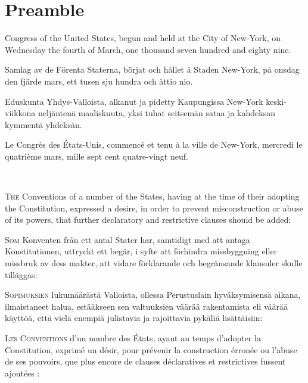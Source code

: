 \documentclass[a4paper,landscape,12pt]{article}
\begin{document}
\section*{Preamble}


\begin{minipage}[t]{0.22\textwidth}
Congress of the United States, begun and held at the City of New-York, on Wednesday the fourth of March, one thousand seven hundred and eighty nine.
\end{minipage}\textwidth
\begin{minipage}[t]{0.22\textwidth}
Samlag av de Förenta Staterna, börjat och hållet å Staden New-York, på onsdag den fjärde mars, ett tusen sju hundra och åttio nio.
\end{minipage}\textwidth
\begin{minipage}[t]{0.22\textwidth}
Eduskunta Yhdys-Valloista, alkanut ja pidetty Kaupungissa New-York keski-viikkona neljäntenä maaliskuuta, yksi tuhat seitsemän sataa ja kahdeksan kymmentä yhdeksän.
\end{minipage}\textwidth
\begin{minipage}[t]{0.22\textwidth}
Le Congrès des États-Unis, commencé et tenu à la ville de New-York, mercredi le quatrième mars, mille sept cent quatre-vingt neuf.
\end{minipage}

~

\begin{minipage}[t]{0.22\textwidth}
\textsc{The} Conventions of a number of the States, having at the time of their adopting the Constitution, expressed a desire, in order to prevent misconstruction or abuse of its powers, that further declaratory and restrictive clauses should be added:
\end{minipage}\textwidth
\begin{minipage}[t]{0.22\textwidth}
\textsc{Som} Konventen från ett antal Stater har, samtidigt med att antaga Konstitutionen, uttryckt ett begär, i syfte att förhindra missbyggning eller missbruk av dess makter, att vidare förklarande och begränsande klausuler skulle tilläggas:
\end{minipage}\textwidth
\begin{minipage}[t]{0.22\textwidth}
\textsc{Sopimuksien} lukumäärästä Valloista, ollessa Perustuslain hyväksymisensä aikana, ilmaistaneet halua, estääkseen sen valtuuksien väärää rakentamista eli väärää käyttöä, että vielä enempiä julistavia ja rajoittavia pykäliä lisättäisiin:
\end{minipage}\textwidth
\begin{minipage}[t]{0.22\textwidth}
\textsc{Les Conventions} d'un nombre des États, ayant au temps d'adopter la Constitution, exprimé un désir, pour prévenir la construction érronée ou l'abuse de ses pouvoirs, que plus encore de clauses déclaratives et restrictives fussent ajoutées :
\end{minipage}
\end{document}
